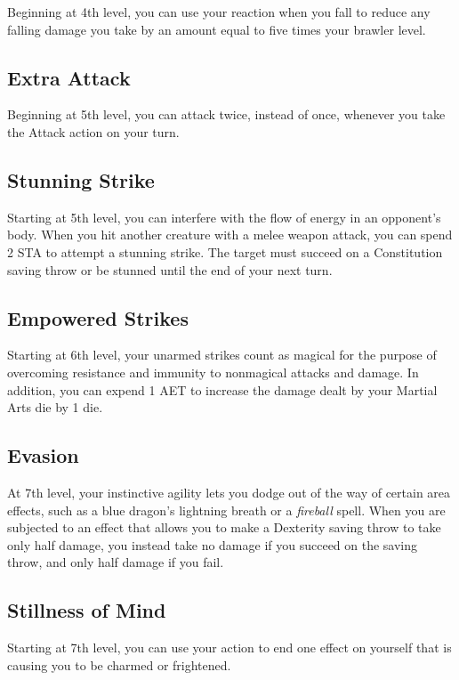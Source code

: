 Beginning at 4th level, you can use your reaction when you fall to reduce any falling damage you take by an amount equal to five times your brawler level.

\subsection{Extra Attack}

Beginning at 5th level, you can attack twice, instead of once, whenever you take the Attack action on your turn.

\subsection{Stunning Strike}

Starting at 5th level, you can interfere with the flow of energy in an opponent's body. When you hit another creature with a melee weapon attack, you can spend 2 STA to attempt a stunning strike. The target must succeed on a Constitution saving throw or be stunned until the end of your next turn.

\subsection{Empowered Strikes}

Starting at 6th level, your unarmed strikes count as magical for the purpose of overcoming resistance and immunity to nonmagical attacks and damage. In addition, you can expend 1 AET to increase the damage dealt by your Martial Arts die by 1 die.

\subsection{Evasion}

At 7th level, your instinctive agility lets you dodge out of the way of certain area effects, such as a blue dragon's lightning breath or a \textit{fireball} spell. When you are subjected to an effect that allows you to make a Dexterity saving throw to take only half damage, you instead take no damage if you succeed on the saving throw, and only half damage if you fail.

\subsection{Stillness of Mind}

Starting at 7th level, you can use your action to end one effect on yourself that is causing you to be charmed or frightened.

